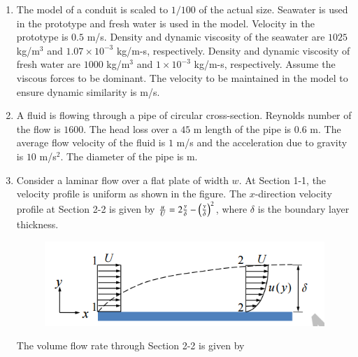 \documentclass[a4paper,10pt]{article}
\begin{document}
\begin{enumerate}
    \hfill{}

    \item The model of a conduit is scaled to $1/100$ of the actual size. Seawater is used in the prototype and fresh water is used in the model. Velocity in the prototype is $0.5$ m/s. Density and dynamic viscosity of the seawater are $1025$ kg/m$^3$ and $1.07 \times 10^{-3}$ kg/m-s, respectively. Density and dynamic viscosity of fresh water are $1000$ kg/m$^3$ and $1 \times 10^{-3}$ kg/m-s, respectively. Assume the viscous forces to be dominant. The velocity to be maintained in the model to ensure dynamic similarity is \underline{\hspace{2cm}} m/s.
    
    \hfill{}

    \item A fluid is flowing through a pipe of circular cross-section. Reynolds number of the flow is $1600$. The head loss over a $45$ m length of the pipe is $0.6$ m. The average flow velocity of the fluid is $1$ m/s and the acceleration due to gravity is $10$ m/s$^2$. The diameter of the pipe is \underline{\hspace{2cm}} m.
    
    \hfill{}

    \item Consider a laminar flow over a flat plate of width $w$. At Section 1-1, the velocity profile is uniform as shown in the figure. The $x$-direction velocity profile at Section 2-2 is given by $\frac{u}{U} = 2\frac{y}{\delta} - \left(\frac{y}{\delta}\right)^2$, where $\delta$ is the boundary layer thickness.
    \begin{figure}[H] \centering \includegraphics[width=0.7\columnwidth]{Bq20.png} \caption*{} \label{fig:q20_fluid} \end{figure}
    The volume flow rate through Section 2-2 is given by
    
    \hfill{}
    \begin{enumerate}
    \end{enumerate}
    

\end{enumerate}
\end{document}
